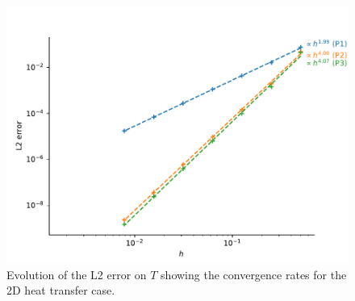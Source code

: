 \begin{figure}
    \centering
    \includegraphics[width=\linewidth]{Figures/Chapter2/convergence_rate_heat_transfer.pdf}
    \caption{Evolution of the L2 error on $T$ showing the convergence rates for the 2D heat transfer case.}
\end{figure}
